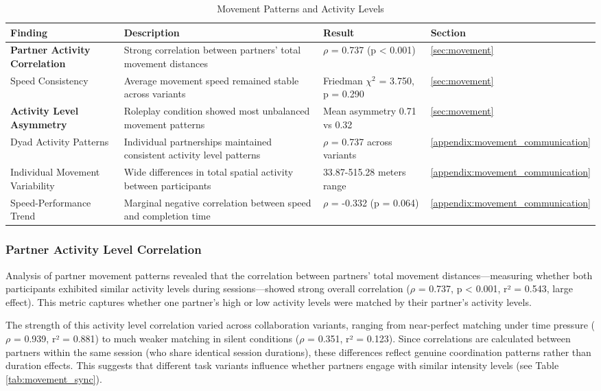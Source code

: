 \begin{table}[!t]
\centering
\caption{Movement Patterns and Activity Levels}
\label{tab:movement_summary}
\begin{tabular}{@{}p{3.2cm}p{5.5cm}p{3.2cm}p{2.3cm}@{}}
\toprule
\textbf{Finding} & \textbf{Description} & \textbf{Result} & \textbf{Section} \\
\midrule
\textbf{Partner Activity Correlation} & Strong correlation between partners' total movement distances & $\rho$ = 0.737 (p < 0.001) & \ref{sec:movement} \\
Speed Consistency & Average movement speed remained stable across variants & Friedman $\chi^2$ = 3.750, p = 0.290 & \ref{sec:movement} \\
\textbf{Activity Level Asymmetry} & Roleplay condition showed most unbalanced movement patterns & Mean asymmetry 0.71 vs 0.32 & \ref{sec:movement} \\
Dyad Activity Patterns & Individual partnerships maintained consistent activity level patterns & $\rho$ = 0.737 across variants & \ref{appendix:movement_communication} \\
Individual Movement Variability & Wide differences in total spatial activity between participants & 33.87-515.28 meters range & \ref{appendix:movement_communication} \\
Speed-Performance Trend & Marginal negative correlation between speed and completion time & $\rho$ = -0.332 (p = 0.064) & \ref{appendix:movement_communication} \\
\bottomrule
\end{tabular}
\end{table}

\subsubsection{Partner Activity Level Correlation}

Analysis of partner movement patterns revealed that the correlation between partners' total movement distances—measuring whether both participants exhibited similar activity levels during sessions—showed strong overall correlation ($\rho$ = 0.737, p < 0.001, r² = 0.543, large effect). This metric captures whether one partner's high or low activity levels were matched by their partner's activity levels.

The strength of this activity level correlation varied across collaboration variants, ranging from near-perfect matching under time pressure ($\rho$ = 0.939, r² = 0.881) to much weaker matching in silent conditions ($\rho$ = 0.351, r² = 0.123). Since correlations are calculated between partners within the same session (who share identical session durations), these differences reflect genuine coordination patterns rather than duration effects. This suggests that different task variants influence whether partners engage with similar intensity levels (see Table \ref{tab:movement_sync}).


